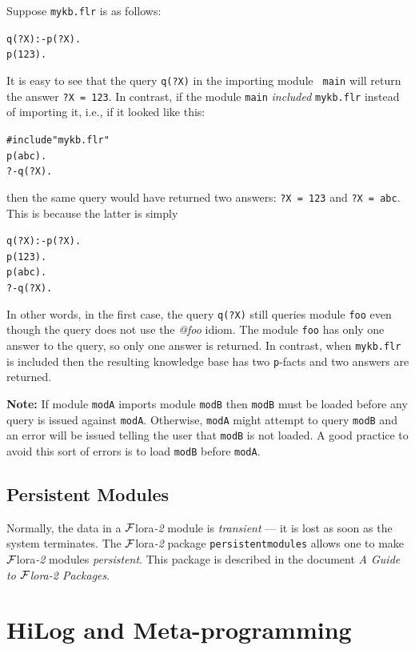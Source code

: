 \documentclass[11pt]{article}
\newcommand{\FLORA}{{\mbox{\sc ${\cal F}${lora}\rm\emph{-2}}}\xspace}
\newcommand{\FLSYSTEM}{\FLORA}
\newcommand{\flrext}{flr\xspace}
\begin{document}
Suppose {\tt mykb.\flrext} is as follows:
\begin{alltt}
  q(?X) :- p(?X).
  p(123).
\end{alltt}
It is easy to see that the query {\tt q(?X)} in the importing module {\tt
  main} will return the answer {\tt ?X = 123}. In contrast, if the module
{\tt main} \emph{included} {\tt mykb.\flrext} instead of importing it, i.e.,
if it looked like this:
\begin{alltt}
  #include "mykb.\flrext"
  p(abc).
  ?- q(?X).
\end{alltt}
then the same query would have returned two answers: {\tt ?X = 123} and 
{\tt ?X = abc}. This is because the latter is simply
\begin{alltt}
  q(?X) :- p(?X).
  p(123).
  p(abc).
  ?- q(?X).
\end{alltt}
In other words, in the first case, the query {\tt q(?X)} still queries
module {\tt foo} even though the query does not use the \emph{@foo}    
idiom. The module {\tt foo} has only one answer to the query, so only one
answer is returned. In contrast, when {\tt mykb.\flrext} is included then
the resulting knowledge base has two {\tt p}-facts and two answers are returned. 

\textbf{Note:} If module \texttt{modA} imports module \texttt{modB}
then \texttt{modB} must be loaded before
any query is issued against \texttt{modA}. Otherwise, \texttt{modA} might
attempt to query \texttt{modB} and an error will be issued telling the user
that \texttt{modB} is not loaded. A good practice to avoid this sort of
errors is to load \texttt{modB} before \texttt{modA}.

\subsection{Persistent Modules}\label{sec-persist-storage}

Normally, the data
in a \FLSYSTEM module is
{\em transient} --- it is lost as soon as the system terminates.
The \FLSYSTEM package {\tt persistentmodules}  allows one to make
\FLSYSTEM modules \emph{persistent}. This package is described in
the document \emph{A Guide to \FLSYSTEM Packages}.


\ifdef{\isfloraman}{
}
{
    
}



\section{HiLog and Meta-programming} \label{sec:hilog}
\end{document}
